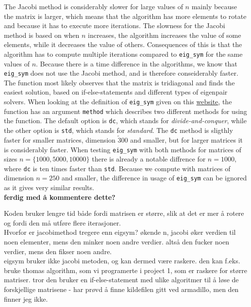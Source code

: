 \documentclass{article}
\begin{document}
  The Jacobi method is considerably slower for large values of $n$ mainly because the matrix is larger, which means that the algorithm has more elements to rotate and because it has to execute more iterations. The slowness for the Jacobi method is based on when $n$ increases, the algorithm increases the value of some elements, while it decreases the value of others. Consequences of this is that the algorithm has to compute multiple iterations compared to \texttt{eig\_sym} for the same values of $n$.
  Because there is a time difference in the algorithms, we know that \texttt{eig\_sym} does not use the Jacobi method, and is therefore conseiderably faster. The function most likely observes that the matrix is tridiagonal and finds the easiest solution, based on if-else-statements and different types of eigenpair solvers. When looking at the definition of \texttt{eig\_sym} given on this \href{http://arma.sourceforge.net/docs.html#eig_sym}{website}, the function has an argument \texttt{method} which describes two different methods for using the function. The default option is \texttt{dc}, which stands for \textit{divide-and-conquer}, while the other option is \texttt{std}, which stands for \textit{standard}. The \texttt{dc} method is sligthly faster for smaller matrices, dimension $\tilde 300$ and smaller, but for larger matrices it is considerably faster.
  When testing \texttt{eig\_sym} with both methods for matrices of sizes $n = \{ 1000, 5000, 10000\}$ there is already a notable diffrence for $n = 1000$, where \texttt{dc} is ten times faster than \texttt{std}. Because we compute with matrices of dimension $n = 250$ and smaller, the difference in usage of \texttt{eig\_sym} can be ignored as it gives very similar results. \\

  \textbf{ferdig med å kommentere dette?}

  Koden bruker lengre tid både fordi matrisen er større, slik at det er mer å rotere og fordi den må
  utføre flere iterasjoner. \\

  Hvorfor er jacobimethod tregere enn eigsym? økende n, jacobi øker verdien til noen elementer, mens den minker noen andre verdier. altså den fucker noen verdier, mens den fikser noen andre. \\

  eigsym bruker ikke jacobi metoden, og kan dermed være raskere. den kan f.eks. bruke thomas algorithm, som vi programerte i project 1, som er raskere for større matriser. tror den bruker en if-else-statement med ulike algoritmer til å løse de forskjellige matrisene - har prøvd å finne kildefilen gitt ved armadillo, men den finner jeg ikke. \\
\end{document}
